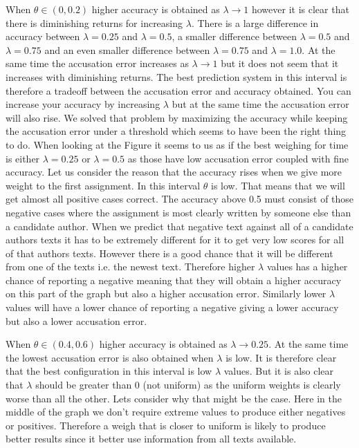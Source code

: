 \begin{description}
        When $\theta \in (0, 0.2)$ higher accuracy is obtained as $\lambda
        \rightarrow 1$ however it is clear that there is diminishing returns
        for increasing $\lambda$. There is a large difference in accuracy
        between $\lambda = 0.25$ and $\lambda = 0.5$, a smaller difference
        between $\lambda = 0.5$ and $\lambda = 0.75$ and an even smaller
        difference between $\lambda = 0.75$ and $\lambda = 1.0$. At the same
        time the accusation error increases as $\lambda \rightarrow 1$ but it
        does not seem that it increases with diminishing returns. The best
        prediction system in this interval is therefore a tradeoff between the
        accusation error and accuracy obtained. You can increase your accuracy
        by increasing $\lambda$ but at the same time the accusation error will
        also rise. We solved that problem by maximizing the accuracy while
        keeping the accusation error under a threshold which seems to have been
        the right thing to do. When looking at the Figure it seems to us as if
        the best weighing for time is either $\lambda = 0.25$ or $\lambda = 0.5$
        as those have low accusation error coupled with fine accuracy. Let us
        consider the reason that the accuracy rises when we give more weight
        to the first assignment. In this interval $\theta$ is low. That means
        that we will get almost all positive cases correct. The accuracy above
        0.5 must consist of those negative cases where the assignment is most
        clearly written by someone else than a candidate author. When we predict
        that negative text against all of a candidate authors texts it has to
        be extremely different for it to get very low scores for all of that
        authors texts. However there is a good chance that it will be different
        from one of the texts i.e. the newest text. Therefore higher $\lambda$
        values has a higher chance of reporting a negative meaning that they
        will obtain a higher accuracy on this part of the graph but also a
        higher accusation error. Similarly lower $\lambda$ values will have a
        lower chance of reporting a negative giving a lower accuracy but also a
        lower accusation error.

        When $\theta \in (0.4, 0.6)$ higher accuracy is obtained as $\lambda
        \rightarrow 0.25$. At the same time the lowest accusation error is also
        obtained when $\lambda$ is low. It is therefore clear that the best
        configuration in this interval is low $\lambda$ values. But it is also
        clear that $\lambda$ should be greater than 0 (not uniform) as the
        uniform weights is clearly worse than all the other. Lets consider why
        that might be the case. Here in the middle of the graph we don't require
        extreme values to produce either negatives or positives. Therefore a
        weigh that is closer to uniform is likely to produce better results
        since it better use information from all texts available.


\end{description}
